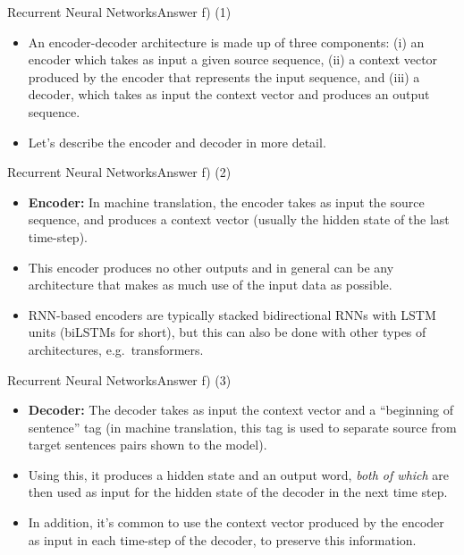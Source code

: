 \documentclass[t]{beamer}
\begin{document}
\begin{frame}{Recurrent Neural Networks}{Answer f) (1)}
    \begin{itemize}
        \item An encoder-decoder architecture is made up of three components: (i)
              an encoder which takes as input a given source sequence, (ii) a
              context vector produced by the encoder that represents the input
              sequence, and (iii) a decoder, which takes as input the context
              vector and produces an output sequence.
        \item Let's describe the encoder and decoder in more detail.
    \end{itemize}
\end{frame}

\begin{frame}{Recurrent Neural Networks}{Answer f) (2)}
    \begin{itemize}
        \item \textbf{Encoder:} In machine translation, the encoder takes as
              input the source sequence, and produces a context vector (usually
              the hidden state of the last time-step).
        \item This encoder produces no other outputs and in general can be any
              architecture that makes as much use of the input data as possible.
        \item RNN-based encoders are typically stacked bidirectional RNNs with
              LSTM units (biLSTMs for short), but this can also be done with
              other types of architectures, e.g.\ transformers.
    \end{itemize}
\end{frame}

\begin{frame}{Recurrent Neural Networks}{Answer f) (3)}
    \begin{itemize}
        \item \textbf{Decoder:} The decoder takes as input the context vector
              and a ``beginning of sentence'' tag (in machine translation, this
              tag is used to separate source from target sentences pairs shown
              to the model).
        \item Using this, it produces a hidden state and an output word,
              \emph{both of which} are then used as input for the hidden state
              of the decoder in the next time step.
        \item In addition, it's common to use the context vector produced by
              the encoder as input in each time-step of the decoder, to preserve
              this information.
    \end{itemize}
\end{frame}
\end{document}
